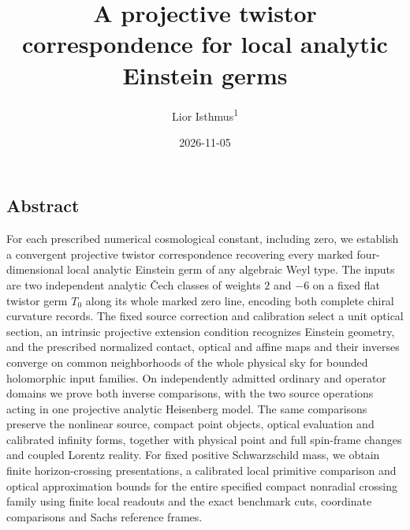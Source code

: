 \documentclass[
  english,
  11pt,
  reqno]{amsart}
\title{A projective twistor correspondence for local analytic Einstein
germs}
\author[Lior Isthmus]{Lior Isthmus\textsuperscript{1}}
\date{2026-11-05}
\begin{document}
\maketitle
{}
\setcounter{footnote}{1}


\protect{}\label{sec:gg-title}

\protect{}\label{a-projective-twistor-correspondence-for-local-analytic-einstein-germs}

\protect{}\label{sec:gg-abstract}

\subsection{Abstract}\label{abstract}

For each prescribed numerical cosmological constant, including zero, we
establish a convergent projective twistor correspondence recovering
every marked four-dimensional local analytic Einstein germ of any
algebraic Weyl type. The inputs are two independent analytic Čech
classes of weights \(2\) and \(-6\) on a fixed flat twistor germ \(T_0\)
along its whole marked zero line, encoding both complete chiral
curvature records. The fixed source correction and calibration select a
unit optical section, an intrinsic projective extension condition
recognizes Einstein geometry, and the prescribed normalized contact,
optical and affine maps and their inverses converge on common
neighborhoods of the whole physical sky for bounded holomorphic input
families. On independently admitted ordinary and operator domains we
prove both inverse comparisons, with the two source operations acting in
one projective analytic Heisenberg model. The same comparisons preserve
the nonlinear source, compact point objects, optical evaluation and
calibrated infinity forms, together with physical point and full
spin-frame changes and coupled Lorentz reality. For fixed positive
Schwarzschild mass, we obtain finite horizon-crossing presentations, a
calibrated local primitive comparison and optical approximation bounds
for the entire specified compact nonradial crossing family using finite
local readouts and the exact benchmark cuts, coordinate comparisons and
Sachs reference frames.

\tableofcontents
\end{document}

